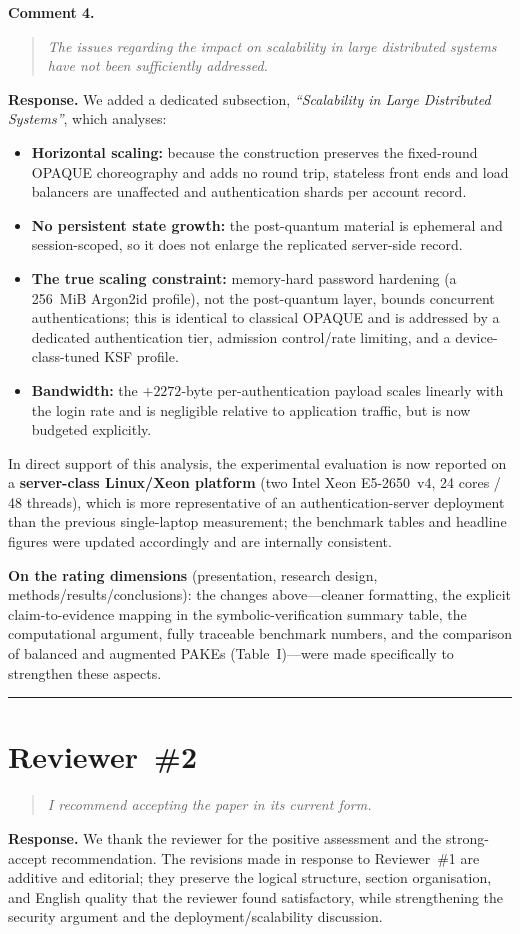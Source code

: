 \documentclass[11pt,a4paper]{article}
\newcommand{\rc}[1]{\par\smallskip\begin{quote}\textcolor{rcol}{\itshape #1}\end{quote}\par}
\begin{document}
\noindent\textbf{Comment 4.}
\rc{The issues regarding the impact on scalability in large distributed systems have not been sufficiently addressed.}
\noindent\textbf{Response.} We added a dedicated subsection, \emph{``Scalability in Large Distributed Systems''}, which analyses:
\begin{itemize}
  \item \textbf{Horizontal scaling:} because the construction preserves the fixed-round OPAQUE choreography and adds no round trip, stateless front ends and load balancers are unaffected and authentication shards per account record.
  \item \textbf{No persistent state growth:} the post-quantum material is ephemeral and session-scoped, so it does not enlarge the replicated server-side record.
  \item \textbf{The true scaling constraint:} memory-hard password hardening (a 256~MiB Argon2id profile), not the post-quantum layer, bounds concurrent authentications; this is identical to classical OPAQUE and is addressed by a dedicated authentication tier, admission control/rate limiting, and a device-class-tuned KSF profile.
  \item \textbf{Bandwidth:} the $+2272$-byte per-authentication payload scales linearly with the login rate and is negligible relative to application traffic, but is now budgeted explicitly.
\end{itemize}
In direct support of this analysis, the experimental evaluation is now reported on a \textbf{server-class Linux/Xeon platform} (two Intel Xeon E5-2650~v4, 24 cores / 48 threads), which is more representative of an authentication-server deployment than the previous single-laptop measurement; the benchmark tables and headline figures were updated accordingly and are internally consistent.

\medskip
\noindent\textbf{On the rating dimensions} (presentation, research design, methods/results/conclusions): the changes above---cleaner formatting, the explicit claim-to-evidence mapping in the symbolic-verification summary table, the computational argument, fully traceable benchmark numbers, and the comparison of balanced and augmented PAKEs (Table~I)---were made specifically to strengthen these aspects.

\bigskip
\hrule
\section*{Reviewer~\#2}

\rc{I recommend accepting the paper in its current form.}
\noindent\textbf{Response.} We thank the reviewer for the positive assessment and the strong-accept recommendation. The revisions made in response to Reviewer~\#1 are additive and editorial; they preserve the logical structure, section organisation, and English quality that the reviewer found satisfactory, while strengthening the security argument and the deployment/scalability discussion.
\end{document}
